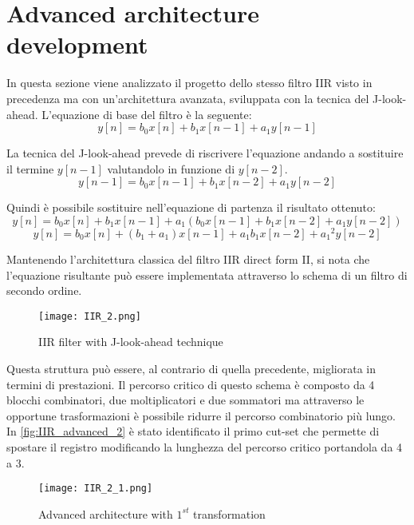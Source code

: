 \section{Advanced architecture development}
In questa sezione viene analizzato il progetto dello stesso filtro IIR visto in precedenza ma con un'architettura avanzata, sviluppata con la tecnica del J-look-ahead. L'equazione di base del filtro è la seguente:
$$ y[n] = b_0x[n] + b_1x[n-1] + a_1y[n-1]$$

La tecnica del J-look-ahead prevede di riscrivere l'equazione andando a sostituire il termine $y[n-1]$ valutandolo in funzione di $y[n-2]$. 
$$ y[n-1] = b_0x[n-1] + b_1x[n-2] + a_1y[n-2]$$

Quindi è possibile sostituire nell'equazione di partenza il risultato ottenuto:
$$ y[n] = b_0x[n] + b_1x[n-1] + a_1(b_0x[n-1] + b_1x[n-2] + a_1y[n-2])$$
$$ y[n] = b_0x[n] + (b_1 + a_1)x[n-1] + a_1b_1x[n-2] + {a_1}^{2}y[n-2]$$

Mantenendo l'architettura classica del filtro IIR direct form II, si nota che l'equazione risultante può essere implementata attraverso lo schema di un filtro di secondo ordine. 

\begin{figure}[h]
	\center
	\texttt{[image: IIR\_2.png]}
	\caption{IIR filter with J-look-ahead technique}
	\label{fig:IIR_advanced}
\end{figure}

Questa struttura può essere, al contrario di quella precedente, migliorata in termini di prestazioni. Il percorso critico di questo schema è composto da 4 blocchi combinatori, due moltiplicatori e due sommatori ma attraverso le opportune trasformazioni è possibile ridurre il percorso combinatorio più lungo. In \autoref{fig:IIR_advanced_2} è stato identificato il primo cut-set che permette di spostare il registro modificando la lunghezza del percorso critico portandola da 4 a 3.

\begin{figure}[h]
	\center
	\texttt{[image: IIR\_2\_1.png]}
	\caption{Advanced architecture with $1^{st}$ transformation}
	\label{fig:IIR_advanced_2}
\end{figure}

